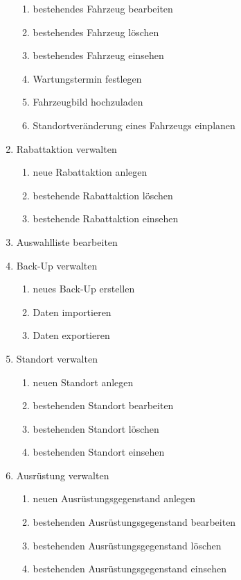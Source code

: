 \begin{enumerate}[itemsep= -0.25 cm]
\begin{enumerate}[itemsep= -0.25 cm]
        \item bestehendes Fahrzeug bearbeiten
        \item bestehendes Fahrzeug löschen
        \item bestehendes Fahrzeug einsehen
        \item Wartungstermin festlegen
        \item Fahrzeugbild hochzuladen
        \item Standortveränderung eines Fahrzeugs einplanen
    \end{enumerate}
    \item Rabattaktion verwalten
    \begin{enumerate}[itemsep= -0.25 cm]
        \item neue Rabattaktion anlegen
        \item bestehende Rabattaktion löschen
        \item bestehende Rabattaktion einsehen
    \end{enumerate}
    \item Auswahlliste bearbeiten
    \item Back-Up verwalten
    \begin{enumerate}[itemsep= -0.25 cm]
        \item neues Back-Up erstellen
        \item Daten importieren
        \item Daten exportieren
    \end{enumerate}
    \item Standort verwalten
    \begin{enumerate}[itemsep= -0.25 cm]
        \item neuen Standort anlegen
        \item bestehenden Standort bearbeiten
        \item bestehenden Standort löschen
        \item bestehenden Standort einsehen
    \end{enumerate}
    \item Ausrüstung verwalten
    \begin{enumerate}[itemsep= -0.25 cm]
        \item neuen Ausrüstungsgegenstand anlegen
        \item bestehenden Ausrüstungsgegenstand bearbeiten
        \item bestehenden Ausrüstungsgegenstand löschen
        \item bestehenden Ausrüstungsgegenstand einsehen

\end{enumerate}
\end{enumerate}
